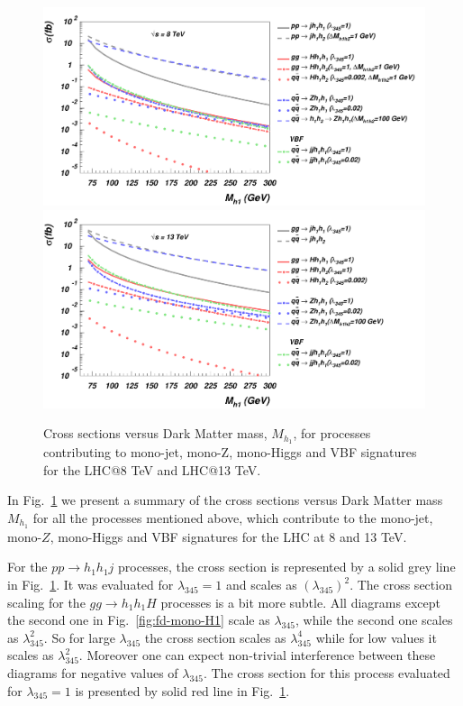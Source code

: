 \documentclass[12pt,a4paper]{article}
\begin{document}
\begin{figure}[htb]
\hskip 3cm\includegraphics[height=0.4\textheight]{sigma_vs_mh1_new_8tev.pdf} 
\vskip -0.2cm
\hskip 3cm\includegraphics[trim={0 0 10.5cm 0},clip,height=0.4\textheight]{sigma_vs_mh1_new_13tev.pdf} 
\vskip -0.2cm
\caption{ Cross sections versus
Dark Matter mass, $M_{h_1}$, for  processes
contributing to mono-jet, mono-Z, mono-Higgs and VBF signatures
for the LHC@8 TeV and  LHC@13 TeV.}
\label{fig:cs}
\end{figure}
%

In Fig.~\ref{fig:cs} we present a summary of the cross sections versus
Dark Matter mass $M_{h_1}$ for all the processes mentioned above, 
which contribute to the mono-jet, mono-$Z$, mono-Higgs and VBF signatures
for the LHC at 8 and 13 TeV.

For the $pp \to  h_1 h_1 j$ processes, the cross section is represented by a solid grey line 
in Fig.~\ref{fig:cs}. It was evaluated for $\lambda_{345}=1$ and scales as $(\lambda_{345})^2$.
The cross section scaling for the $gg\to  h_1 h_1 H$
processes is a bit more subtle. All diagrams except the second one in Fig.~\ref{fig:fd-mono-H1} scale as $\lambda_{345}$,
while the second one scales as  $\lambda_{345}^2$. So for large  $\lambda_{345}$ the
cross section scales as  $\lambda_{345}^4$ while for low values it scales as $\lambda_{345}^2$.
Moreover one can expect non-trivial interference between these
diagrams for negative values of $\lambda_{345}$. The cross section for this process 
evaluated for $\lambda_{345}=1$ is presented by solid red line in Fig.~\ref{fig:cs}.
\end{document}
